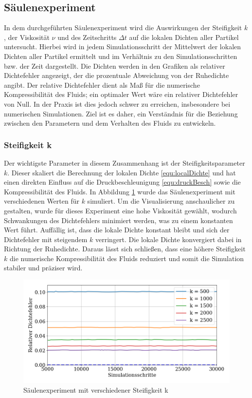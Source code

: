 \documentclass[a4paper, 12pt]{article}
\begin{document}
\subsection{Säulenexperiment}
In dem durchgeführten Säulenexperiment wird die Auswirkungen der Steifigkeit \(k\), der Viskosität \(\nu\) und des Zeitschritts \(\Delta t\) auf die lokalen Dichten aller Partikel untersucht. Hierbei wird in jedem Simulationsschritt der Mittelwert der lokalen Dichten aller Partikel ermittelt und im Verhältnis zu den Simulationsschritten bzw. der Zeit dargestellt. Die Dichten werden in den Grafiken als relativer Dichtefehler angezeigt, der die prozentuale Abweichung von der Ruhedichte angibt. Der relative Dichtefehler dient als Maß für die numerische Kompressibilität des Fluids; ein optimaler Wert wäre ein relativer Dichtefehler von Null. In der Praxis ist dies jedoch schwer zu erreichen, insbesondere bei numerischen Simulationen. Ziel ist es daher, ein Verständnis für die Beziehung zwischen den Parametern und dem Verhalten des Fluids zu entwickeln.

\subsubsection{Steifigkeit k}
Der wichtigste Parameter in diesem Zusammenhang ist der Steifigkeitsparameter \(k\). Dieser skaliert die Berechnung der lokalen Dichte \eqref{equ:localDichte} und hat einen direkten Einfluss auf die Druckbeschleunigung \eqref{equ:druckBesch} sowie die Kompressibilität des Fluids. In Abbildung \ref{Säulenexperiment_k} wurde das Säulenexperiment mit verschiedenen Werten für \(k\) simuliert. Um die Visualisierung anschaulicher zu gestalten, wurde für dieses Experiment eine hohe Viskosität gewählt, wodurch Schwankungen des Dichtefehlers minimiert werden, was zu einem konstanten Wert führt. Auffällig ist, dass die lokale Dichte konstant bleibt und sich der Dichtefehler mit steigendem \(k\) verringert. Die lokale Dichte konvergiert dabei in Richtung der Ruhedichte. Daraus lässt sich schließen, dass eine höhere Steifigkeit \(k\) die numerische Kompressibilität des Fluids reduziert und somit die Simulation stabiler und präziser wird.

\begin{figure}[H]
	\centering
	\includegraphics[width=.85\textwidth]{graphics/Steifigkeit.png}	
	\caption{Säulenexperiment mit verschiedener Steifigkeit k}
	\label{Säulenexperiment_k}
\end{figure}
\end{document}
